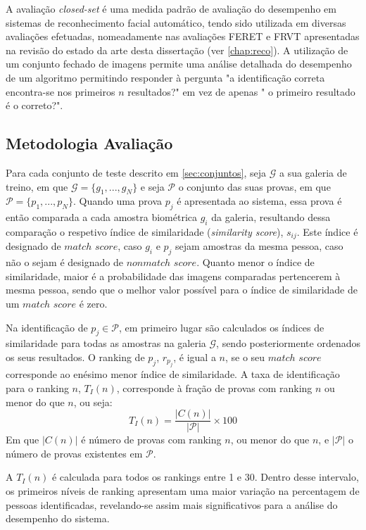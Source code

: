 A avaliação \textit{closed-set} é uma medida padrão de avaliação do desempenho em sistemas de reconhecimento facial automático, tendo sido utilizada em diversas avaliações efetuadas, nomeadamente nas avaliações FERET e FRVT apresentadas na revisão do estado da arte desta dissertação (ver \ref{chap:reco}). A utilização de um conjunto fechado de imagens permite uma análise detalhada do desempenho de um algoritmo permitindo responder à pergunta "a identificação correta encontra-se nos primeiros $n$ resultados?" em vez de apenas " o primeiro resultado é o correto?".

\subsection{Metodologia Avaliação}
Para cada conjunto de teste descrito em \ref{sec:conjuntos}, seja $\mathscr{G}$ a sua galeria de treino, em que $\mathscr{G} = \{g_1, ..., g_N\}$ e seja $\mathscr{P}$ o conjunto das suas provas, em que $\mathscr{P} = \{p_1, ..., p_N\}$. Quando uma prova $p_j$ é apresentada ao sistema, essa prova é então comparada a cada amostra biométrica $g_i$ da galeria, resultando dessa comparação o respetivo índice de similaridade (\textit{similarity score}), $s_{ij}$. Este índice é designado de $match$ $score$, caso $g_i$ e $p_j$ sejam amostras da mesma pessoa, caso não o sejam é designado de $nonmatch$ $score$. Quanto menor o índice de similaridade, maior é a probabilidade das imagens comparadas pertencerem à mesma pessoa, sendo que o melhor valor possível para o índice de similaridade de um $match$ $score$ é zero.

Na identificação de $p_j \in \mathscr{P}$, em primeiro lugar são calculados os índices de similaridade para todas as amostras na galeria $\mathscr{G}$, sendo posteriormente ordenados os seus resultados. O ranking de $p_j$, $r_{p_j}$, é igual a $n$, se o seu $match$ $score$ corresponde ao enésimo menor índice de similaridade. A taxa de identificação para o ranking $n$, $T_{I}(n)$, corresponde à fração de provas com ranking $n$ ou menor do que $n$, ou seja:
\begin{equation}
T_{I}(n) = \frac{|C(n)|}{|\mathscr{P}|} \times 100
\end{equation}
Em que $|C(n)|$ é número de provas com ranking $n$, ou menor do que $n$, e $|\mathscr{P}|$ o número de provas existentes em $\mathscr{P}$.

A $T_{I}(n)$ é calculada para todos os rankings entre 1 e 30. Dentro desse intervalo, os primeiros níveis de ranking apresentam uma maior variação na percentagem de pessoas identificadas, revelando-se assim mais significativos para a análise do desempenho do sistema.

